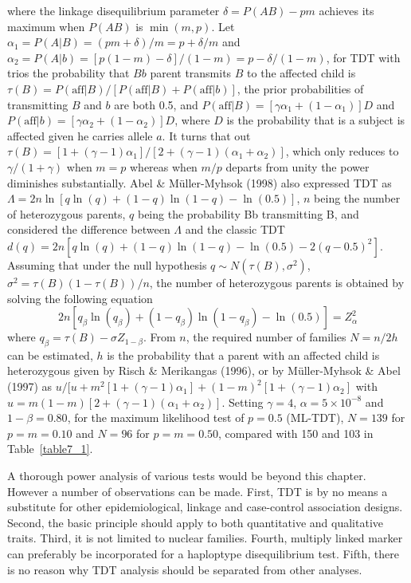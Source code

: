 \noindent where the linkage disequilibrium parameter $\delta=P(AB)-pm$ achieves
its maximum when $P(AB)$ is $\min(m,p)$.  Let
$\alpha_1=P(A|B)=(pm+\delta)/m=p+\delta/m$ and
$\alpha_2=P(A|b)=[p(1-m)-\delta]/(1-m)=p-\delta/(1-m)$, for TDT with trios the
probability that $Bb$ parent transmits $B$ to the affected child is $\tau (B)=
P(\mbox{aff}|B)/[P(\mbox{aff}|B)+P(\mbox{aff}|b)]$, the prior probabilities of
transmitting $B$ and $b$ are both 0.5, and
$P(\mbox{aff}|B)=[\gamma\alpha_1+(1-\alpha_1)]D$ and
$P(\mbox{aff}|b)=[\gamma\alpha_2+(1-\alpha_2)]D$, where $D$ is the probability
that is a subject is affected given he carries allele $a$.  It turns that out
$\tau (B)=[1+(\gamma-1)\alpha_1]/[2+(\gamma-1)(\alpha_1+\alpha_2)]$, which only
reduces to $\gamma/(1+\gamma)$ when $m=p$ whereas when $m/p$ departs from unity
the power diminishes substantially.  Abel \& M\"{u}ller-Myhsok (1998) also
expressed TDT as $\Lambda=2n\ln[q\ln(q)+(1-q)\ln(1-q)-\ln(0.5)]$, $n$ being the
number of heterozygous parents, $q$ being the probability Bb transmitting B,
and considered the difference between $\Lambda$ and the classic TDT
$d(q)=2n[q\ln(q)+(1-q)\ln(1-q)-\ln(0.5)-2(q-0.5)^2]$.  Assuming that under the
null hypothesis $q\sim N(\tau(B),\sigma^2)$, $\sigma^2=\tau(B)(1-\tau(B))/n$,
the number of heterozygous parents is obtained by solving the following
equation
$$2n[q_\beta\ln(q_\beta)+(1-q_\beta)\ln(1-q_\beta)-\ln(0.5)]=Z_\alpha^2$$ where
$q_\beta=\tau(B)-\sigma Z_{1-\beta}$.  From $n$, the required number of
families $N=n/2h$ can be estimated, $h$ is the probability that a parent with
an affected child is heterozygous given by Risch \& Merikangas (1996), or by
M\"{u}ller-Myhsok \& Abel (1997) as
$u/[u+m^2[1+(\gamma-1)\alpha_1]+(1-m)^2[1+(\gamma-1)\alpha_2]$ with
$u=m(1-m)[2+(\gamma-1)(\alpha_1+\alpha_2)]$.  Setting $\gamma=4$,
$\alpha=5\times 10^{-8}$ and $1-\beta=0.80$, for the maximum likelihood test of
$p=0.5$ (ML-TDT), $N=139$ for $p=m=0.10$ and $N=96$ for $p=m=0.50$, compared
with 150 and 103 in Table~\ref{table7_1}.

A thorough power analysis of various tests would be beyond this chapter.
However a number of observations can be made.  First, TDT is by no means a
substitute for other epidemiological, linkage and case-control association
designs.  Second, the basic principle should apply to both quantitative and
qualitative traits.  Third, it is not limited to nuclear families.  Fourth,
multiply linked marker can preferably be incorporated for a haploptype
disequilibrium test.  Fifth, there is no reason why TDT analysis should be
separated from other analyses.

